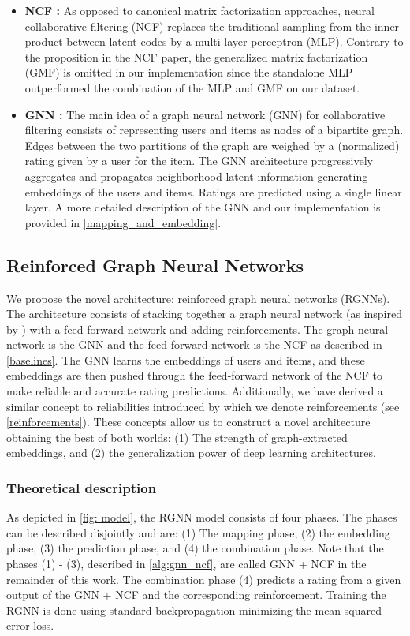 \begin{itemize}[leftmargin=0cm]
    \item[]
    \textbf{NCF \citep{he2017neural}:} As opposed to canonical matrix factorization approaches, neural collaborative filtering (NCF) replaces the traditional sampling from the inner product between latent codes by a multi-layer perceptron (MLP). Contrary to the proposition in the NCF paper, the generalized matrix factorization (GMF) is omitted in our implementation since the standalone MLP outperformed the combination of the MLP and GMF on our dataset.
    
    \item[]
    \textbf{GNN \citep{wang2019neural}:} The main idea of a graph neural network (GNN) for collaborative filtering consists of representing users and items as nodes of a bipartite graph. Edges between the two partitions of the graph are weighed by a (normalized) rating given by a user for the item. The GNN architecture progressively aggregates and propagates neighborhood latent information generating embeddings of the users and items. Ratings are predicted using a single linear layer. A more detailed description of the GNN and our implementation is provided in \autoref{mapping_and_embedding}.
\end{itemize}


\subsection{Reinforced Graph Neural Networks} \label{model}
We propose the novel architecture: reinforced graph neural networks (RGNNs). The architecture consists of stacking together a graph neural network (as inspired by \citet{wang2019neural, wu2021graph}) with a feed-forward network and adding reinforcements. The graph neural network is the GNN \citep{wang2019neural} and the feed-forward network is the NCF \citep{he2017neural} as described in \autoref{baselines}. The GNN learns the embeddings of users and items, and these embeddings are then pushed through the feed-forward network of the NCF to make reliable and accurate rating predictions. Additionally, we have derived a similar concept to reliabilities introduced by \citet{reliability} which we denote reinforcements (see \autoref{reinforcements}). These concepts allow us to construct a novel architecture obtaining the best of both worlds: (1) The strength of graph-extracted embeddings, and (2) the generalization power of deep learning architectures.

\subsubsection{Theoretical description}
As depicted in \autoref{fig: model}, the RGNN model consists of four phases. The phases can be described disjointly and are: (1) The mapping phase, (2) the embedding phase, (3) the prediction phase, and (4) the combination phase. Note that the phases (1) - (3), described in \autoref{alg:gnn_ncf}, are called GNN + NCF in the remainder of this work. The combination phase (4) predicts a rating from a given output of the GNN + NCF and the corresponding reinforcement. Training the RGNN is done using standard backpropagation minimizing the mean squared error loss.

